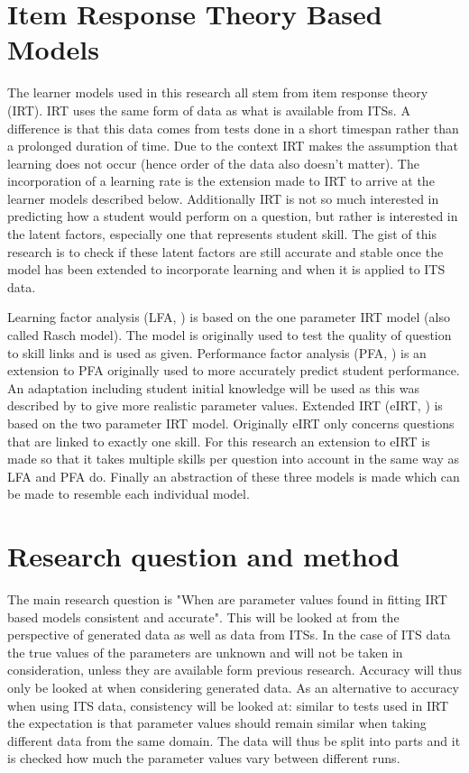 \documentclass{scrartcl}
\begin{document}
 \section{Item Response Theory Based Models}
 The learner models used in this research all stem from item response theory (IRT). IRT uses the same form of data as what is available from ITSs. A difference is that this data comes from tests done in a short timespan rather than a prolonged duration of time. Due to the context IRT makes the assumption that learning does not occur (hence order of the data also doesn't matter). The incorporation of a learning rate is the extension made to IRT to arrive at the learner models described below. Additionally IRT is not so much interested in predicting how a student would perform on a question, but rather is interested in the latent factors, especially one that represents student skill. The gist of this research is to check if these latent factors are still accurate and stable once the model has been extended to incorporate learning and when it is applied to ITS data.
 
 Learning factor analysis (LFA, \cite{lfa}) is based on the one parameter IRT model (also called Rasch model). The model is originally used to test the quality of question to skill links and is used as given. Performance factor analysis (PFA, \cite{pfa}) is an extension to PFA originally used to more accurately predict student performance. An adaptation including student initial knowledge will be used as this was described by \cite{ktpfa} to give more realistic parameter values. Extended IRT (eIRT, \cite{eirt}) is based on the two parameter IRT model. Originally eIRT only concerns questions that are linked to exactly one skill. For this research an extension to eIRT is made so that it takes multiple skills per question into account in the same way as LFA and PFA do. Finally an abstraction of these three models is made which can be made to resemble each individual model.

\section{Research question and method}
The main research question is "When are parameter values found in fitting IRT based models consistent and accurate". This will be looked at from the perspective of generated data as well as data from ITSs. In the case of ITS data the true values of the parameters are unknown and will not be taken in consideration, unless they are available form previous research. Accuracy will thus only be looked at when considering generated data. As an alternative to accuracy when using ITS data, consistency will be looked at: similar to tests used in IRT the expectation is that parameter values should remain similar when taking different data from the same domain. The data will thus be split into parts and it is checked how much the parameter values vary between different runs.
\end{document}
